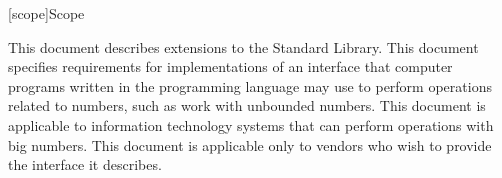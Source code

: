 
[scope]{Scope}

\pnum
 This document describes extensions to the \Cpp Standard Library. This document specifies requirements for implementations of an interface that computer programs written in the \Cpp programming language may use to perform operations related to numbers, such as work with unbounded numbers. This document is applicable to information technology systems that can perform operations with big numbers. This document is applicable only to vendors who wish to provide the interface it describes.

